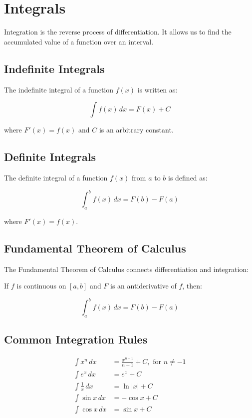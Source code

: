 \documentclass{article}
\begin{document}
\section{Integrals}

Integration is the reverse process of differentiation. It allows us to find the accumulated value of a function over an interval.

\subsection{Indefinite Integrals}

The indefinite integral of a function $f(x)$ is written as:

$$\int f(x) \, dx = F(x) + C$$

where $F'(x) = f(x)$ and $C$ is an arbitrary constant.

\subsection{Definite Integrals}

The definite integral of a function $f(x)$ from $a$ to $b$ is defined as:

$$\int_a^b f(x) \, dx = F(b) - F(a)$$

where $F'(x) = f(x)$.

\subsection{Fundamental Theorem of Calculus}

The Fundamental Theorem of Calculus connects differentiation and integration:

If $f$ is continuous on $[a, b]$ and $F$ is an antiderivative of $f$, then:

$$\int_a^b f(x) \, dx = F(b) - F(a)$$

\subsection{Common Integration Rules}

\begin{align}
\int x^n \, dx &= \frac{x^{n+1}}{n+1} + C, \text{ for } n \neq -1 \\
\int e^x \, dx &= e^x + C \\
\int \frac{1}{x} \, dx &= \ln|x| + C \\
\int \sin x \, dx &= -\cos x + C \\
\int \cos x \, dx &= \sin x + C
\end{align}
\end{document}
